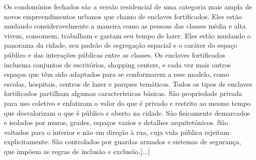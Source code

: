 \documentclass[
    12pt,
    oneside,            %
    a4paper,
    brazilian
    ]{abntex2}
\begin{document}
\begin{citacao}
	Os condomínios fechados são a versão residencial de uma categoria mais ampla
	de novos empreendimentos urbanos que chamo de enclaves fortificados. Eles estão
	mudando consideravelmente a maneira como as pessoas das classes média e alta
	vivem, consomem, trabalham e gastam seu tempo de lazer. Eles estão mudando o
	panorama da cidade, seu padrão de segregação espacial e o caráter do espaço público
	e das interações públicas entre as classes. Os enclaves fortificados incluema
	conjuntos de escritórios, shopping centers, e cada vez mais outros espaços que têm
	sido adaptados para se conformarem a esse modelo, como escolas, hospitais, centros
	de lazer e parques temáticos. Todos os tipos de enclaves fortificados partilham
	algumas características básicas. São propriedade privada para uso coletivo e enfatizam
	o valor do que é privado e restrito ao mesmo tempo que desvalorizam o
	que é público e aberto na cidade. São fisicamente demarcados e isolados por muros,
	grades, espaços vazios e detalhes arquitetônicos. São voltados para o interior e
	não em direção à rua, cuja vida pública rejeitam explicitamente. São controlados
	por guardas armados e sistemas de segurança, que impõem as regras de inclusão e
	exclusão.[...] %
	\cite[p.~258-259]{caldeira2000}
\end{citacao}
\end{document}
